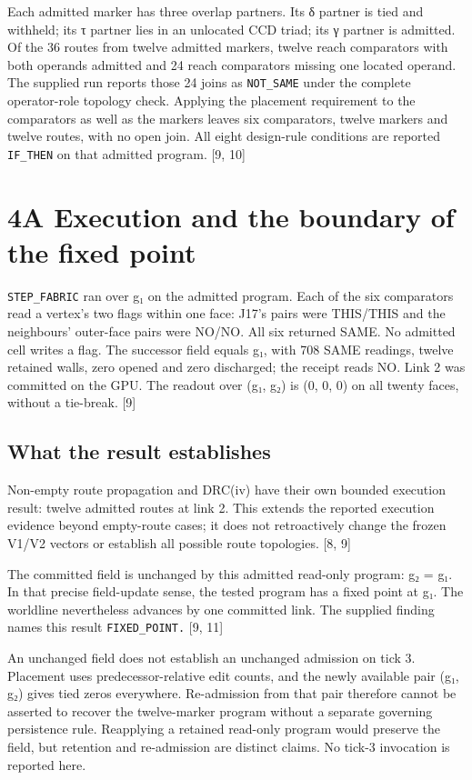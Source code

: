 \documentclass[
]{article}
\begin{document}
Each admitted marker has three overlap partners. Its δ partner is tied
and withheld; its τ partner lies in an unlocated CCD triad; its γ
partner is admitted. Of the 36 routes from twelve admitted markers,
twelve reach comparators with both operands admitted and 24 reach
comparators missing one located operand. The supplied run reports those
24 joins as \nolinkurl{NOT_SAME} under the complete operator-role
topology check. Applying the placement requirement to the comparators as
well as the markers leaves six comparators, twelve markers and twelve
routes, with no open join. All eight design-rule conditions are reported
\nolinkurl{IF_THEN} on that admitted program. {[}9, 10{]}

\section{4A Execution and the boundary of the fixed
point}\label{a-execution-and-the-boundary-of-the-fixed-point}

\nolinkurl{STEP_FABRIC} ran over g₁ on the admitted program. Each of the
six comparators read a vertex's two flags within one face: J17's pairs
were THIS/THIS and the neighbours' outer-face pairs were NO/NO. All six
returned SAME. No admitted cell writes a flag. The successor field
equals g₁, with 708 SAME readings, twelve retained walls, zero opened
and zero discharged; the receipt reads NO. Link 2 was committed on the
GPU. The readout over (g₁, g₂) is (0, 0, 0) on all twenty faces, without
a tie-break. {[}9{]}

\subsection{What the result
establishes}\label{what-the-result-establishes}

Non-empty route propagation and DRC(iv) have their own bounded execution
result: twelve admitted routes at link 2. This extends the reported
execution evidence beyond empty-route cases; it does not retroactively
change the frozen V1/V2 vectors or establish all possible route
topologies. {[}8, 9{]}

The committed field is unchanged by this admitted read-only program: g₂
= g₁. In that precise field-update sense, the tested program has a fixed
point at g₁. The worldline nevertheless advances by one committed link.
The supplied finding names this result \nolinkurl{FIXED_POINT.} {[}9,
11{]}

An unchanged field does not establish an unchanged admission on tick 3.
Placement uses predecessor-relative edit counts, and the newly available
pair (g₁, g₂) gives tied zeros everywhere. Re-admission from that pair
therefore cannot be asserted to recover the twelve-marker program
without a separate governing persistence rule. Reapplying a retained
read-only program would preserve the field, but retention and
re-admission are distinct claims. No tick-3 invocation is reported here.
\end{document}
